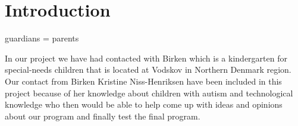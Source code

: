 \chapter{Introduction}

guardians = parents

In our project we have had contacted with Birken which is a kindergarten for special-needs children that is located at Vodskov in Northern Denmark region. Our contact from Birken Kristine Niss-Henriksen have been included in this project because of her knowledge about children with autism and technological knowledge who then would be able to help come up with ideas and opinions about our program and finally test the final program.  


 